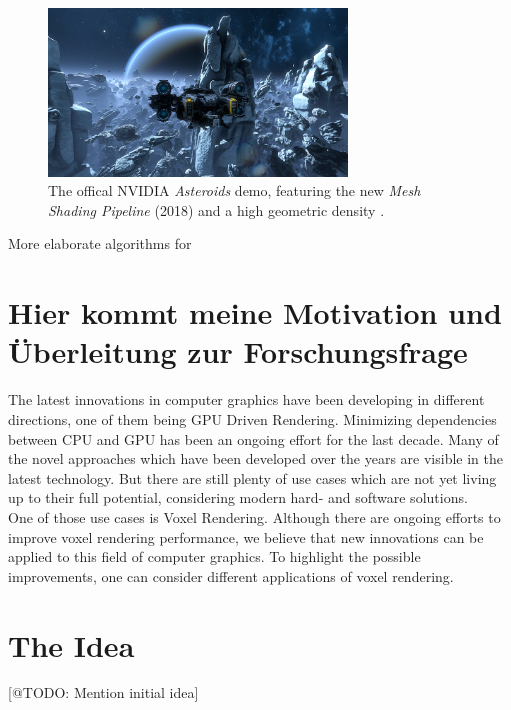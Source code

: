 \begin{figure}[h]
    \centering
    \includegraphics[width=300px]{images/graphics/mesh-shading-asteroids-demo.png}
    \caption{The offical NVIDIA \emph{Asteroids} demo, featuring the new \emph{Mesh Shading Pipeline} (2018)
    and a high geometric density \cite{Kraemer2018}.}
    \label{fig:mesh-shading-asteroids-demo}
\end{figure}


More elaborate algorithms for 

\section{Hier kommt meine Motivation und Überleitung zur Forschungsfrage} \label{sec-todo}

The latest innovations in computer graphics have been developing in different directions,
one of them being \ac{GPU} Driven Rendering. Minimizing dependencies between \ac{CPU} and \ac{GPU} 
has been an ongoing effort for the last decade. Many of the novel approaches which have been developed 
over the years are visible in the latest technology. But there are still plenty of use cases 
which are not yet living up to their full potential, considering modern hard- and software solutions.\\

\noindent
One of those use cases is Voxel Rendering. Although there are ongoing efforts to improve voxel 
rendering performance, we believe that new innovations can be applied to this field of computer 
graphics. To highlight the possible improvements, one can consider different applications of 
voxel rendering. 






\section{The Idea}

[@TODO: Mention initial idea]

